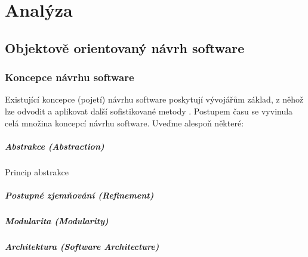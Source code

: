 \chapter{Analýza}



\section{Objektově orientovaný návrh software}

\subsection{Koncepce návrhu software}

Existující koncepce (pojetí) návrhu software poskytují vývojářům základ, z něhož lze odvodit a aplikovat další sofistikované metody \cite{wiki:software_design}. Postupem času se vyvinula celá množina koncepcí návrhu software. Uveďme alespoň některé:

\paragraph{Abstrakce (Abstraction)} Princip abstrakce
\paragraph{Postupné zjemňování (Refinement)}
\paragraph{Modularita (Modularity)}
\paragraph{Architektura (Software Architecture)}
